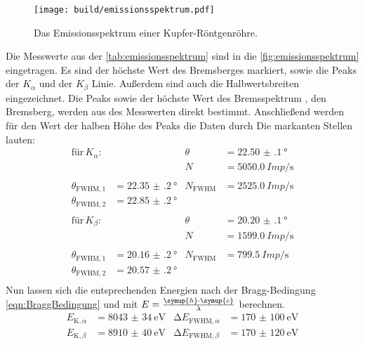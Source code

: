   \begin{figure}[H]
    \centering
    \texttt{[image: build/emissionsspektrum.pdf]}
    \caption{Das Emissionsspektrum einer Kupfer-Röntgenröhre.}
    \label{fig:emissionsspektrum}
  \end{figure}

  \noindent
  Die Messwerte aus der \autoref{tab:emissionsspektrum} sind in die \autoref{fig:emissionsspektrum} eingetragen. Es sind der höchste Wert des Bremsberges markiert,
  sowie die Peaks der $K_{\alpha}$ und der $K_{\beta}$ Linie. Außerdem sind auch die Halbwertsbreiten eingezeichnet. Die Peaks sowie der höchste Wert des Bremsspektrum
  , den Bremsberg, werden aus des Messwerten direkt bestimmt. Anschließend werden für den Wert der halben Höhe des Peaks die Daten durch 
  Die markanten Stellen lauten:
  \begin{align*}
    \text{für} \, K_{\alpha}: &&\theta &= \SI{22.50(10)}{\degree} \\ 
                                  && N &= \SI{5050.0}{Imp\per\second} \\
                                  \\
                \theta_{\text{FWHM}, 1} &= \SI{22.35(20)}{\degree} &  N_{\text{FWHM}} &= \SI{2525.0}{Imp\per\second} \\
                \theta_{\text{FWHM}, 2} &= \SI{22.85(20)}{\degree}  \\
                 \\
    \text{für} \, K_{\beta}: && \theta &= \SI{20.20(10)}{\degree} \\
                            && N &= \SI{1599.0}{Imp\per\second} \\
                            \\
                 \theta_{\text{FWHM}, 1} &= \SI{20.16(20)}{\degree} & N_{\text{FWHM}} &= \SI{799.5}{Imp\per\second} \\
                 \theta_{\text{FWHM}, 2} &= \SI{20.57(20)}{\degree}  \\
  \end{align*}
  Nun lassen sich die entsprechenden Energien nach der Bragg-Bedingung \eqref{eqn:BraggBedingung} und mit $E = \frac{\symup{h} \cdot \symup{c}}{\lambda} $ berechnen. 
  \begin{align*}
    E_{\text{K}, \alpha} &= \SI{8043(34)}{\electronvolt} & \increment E_{\text{FWHM}, \alpha } &= \SI{170(100)}{\electronvolt}\\
    E_{\text{K}, \beta} &= \SI{8910(40)}{\electronvolt}  & \increment E_{\text{FWHM}, \beta } &= \SI{170(120)}{\electronvolt}
  \end{align*}
